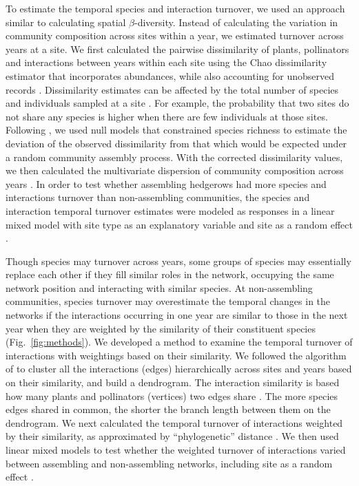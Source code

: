 \documentclass[12pt]{article}
\begin{document}
To estimate the temporal species and interaction turnover, we used an
approach similar to calculating spatial $\beta$-diversity. Instead of
calculating the variation in community composition across sites within
a year, we estimated turnover across years at a site. We first
calculated the pairwise dissimilarity of plants, pollinators and
interactions between years within each site using the Chao
dissimilarity estimator that incorporates abundances, while also
accounting for unobserved records \citep{chao-2005-148}. Dissimilarity
estimates can be affected by the total number of species and
individuals sampled at a site \citep[e.g.,][]{ponisio2015farm}. For
example, the probability that two sites do not share any species is
higher when there are few individuals at those sites. Following
\cite{ponisio2015farm}, we used null models that constrained species
richness to estimate the deviation of the observed dissimilarity from
that which would be expected under a random community assembly
process. With the corrected dissimilarity values, we then calculated
the multivariate dispersion of community composition across years
\citep{anderson-2011-19}. In order to test whether assembling
hedgerows had more species and interactions turnover than
non-assembling communities, the species and interaction temporal
turnover estimates were modeled as responses in a linear mixed model
with site type as an explanatory variable and site as a random effect
\citep{lme4, lmetest}.

Though species may turnover across years, some groups of species may
essentially replace each other if they fill similar roles in the
network, occupying the same network position and interacting with
similar species. At non-assembling communities, species turnover may
overestimate the temporal changes in the networks if the interactions
occurring in one year are similar to those in the next year when they
are weighted by the similarity of their constituent species
(Fig.~\ref{fig:methods}). We developed a method to examine the
temporal turnover of interactions with weightings based on their
similarity. We followed the algorithm of \cite{ahn2010link} to cluster
all the interactions (edges) hierarchically across sites and years
based on their similarity, and build a dendrogram. The interaction
similarity is based how many plants and pollinators (vertices) two
edges share \citep{ahn2010link, kalinka2011linkcomm}. The more species
edges shared in common, the shorter the branch length between them on
the dendrogram.  We next calculated the temporal turnover of
interactions weighted by their similarity, as approximated by
``phylogenetic'' distance \citep{graham2008phylogenetic,
  picante-2010-1463}. We then used linear mixed models to test whether
the weighted turnover of interactions varied between assembling and
non-assembling networks, including site as a random effect
\citep{lme4, lmetest}.
\end{document}
